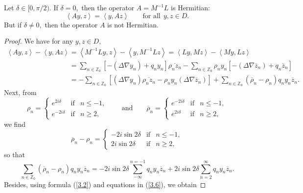 \documentclass[pdftex]{sigma}
\numberwithin{equation}{section}
\begin{document}
\begin{theorem}
\label{Th3.2}Let $\delta \in \lbrack 0,\pi /2).$ If $\delta =0,$ then the
operator $A=M^{-1}L$ is Hermitian:%
\[
\left\langle Ay,z\right\rangle =\left\langle y,Az\right\rangle \qquad \text{for all} \ \ y,z\in D.
\]%
But if $\delta \neq 0,$ then the operator $A$ is not Hermitian.
\end{theorem}

\begin{proof}
We have for any $y,z\in D,$%
\begin{gather*}
\left\langle Ay,z\right\rangle -\left\langle y,Az\right\rangle =\left\langle
M^{-1}Ly,z\right\rangle -\left\langle y,M^{-1}Lz\right\rangle =\left\langle
Ly,Mz\right\rangle -\left\langle My,Lz\right\rangle
\\
\phantom{\left\langle Ay,z\right\rangle -\left\langle y,Az\right\rangle}{}
=\sum_{n\in
\mathbb{Z}
_{0}}[-(\Delta \nabla y_{n})+q_{n}y_{n}]\overline{\rho _{n}z_{n}}-\sum_{n\in
\mathbb{Z}
_{0}}\rho _{n}y_{n}[-(\Delta \nabla \overline{z}_{n})+q_{n}\overline{z}_{n}]
\\
\phantom{\left\langle Ay,z\right\rangle -\left\langle y,Az\right\rangle}{}
=-\sum_{n\in
\mathbb{Z}
_{0}}[(\Delta \nabla y_{n})\overline{\rho _{n}z_{n}}-\rho _{n}y_{n}(\Delta
\nabla \overline{z}_{n})]+\sum_{n\in
\mathbb{Z}
_{0}}(\overline{\rho }_{n}-\rho _{n})q_{n}y_{n}\overline{z}_{n}.
\end{gather*}
Next, from%
\[
\rho _{n}=\left\{
\begin{array}{lll}
e^{2i\delta } & \text{if} & n\leq -1, \\
e^{-2i\delta } & \text{if} & n\geq 2,
\end{array}%
\right. \qquad \text{and}\qquad \overline{\rho }_{n}=\left\{
\begin{array}{lll}
e^{-2i\delta } & \text{if} & n\leq -1, \\
e^{2i\delta } & \text{if} & n\geq 2,
\end{array}%
\right.
\]
we f\/ind%
\[
\overline{\rho }_{n}-\rho _{n}=\left\{
\begin{array}{lll}
-2i\sin 2\delta & \text{if} & n\leq -1, \\
2i\sin 2\delta & \text{if} & n\geq 2,
\end{array}%
\right.
\]%
so that%
\[
\sum_{n\in
\mathbb{Z}
_{0}}(\overline{\rho }_{n}-\rho _{n})q_{n}y_{n}\overline{z}_{n}=-2i\sin
2\delta \sum_{-\infty }^{n=-1}q_{n}y_{n}\overline{z}_{n}+2i\sin 2\delta
\sum_{n=2}^{\infty }q_{n}y_{n}\overline{z}_{n}.
\]
Besides, using formula (\ref{3.2}) and equations in (\ref{3.6}), we obtain%

\end{proof}
\end{document}
